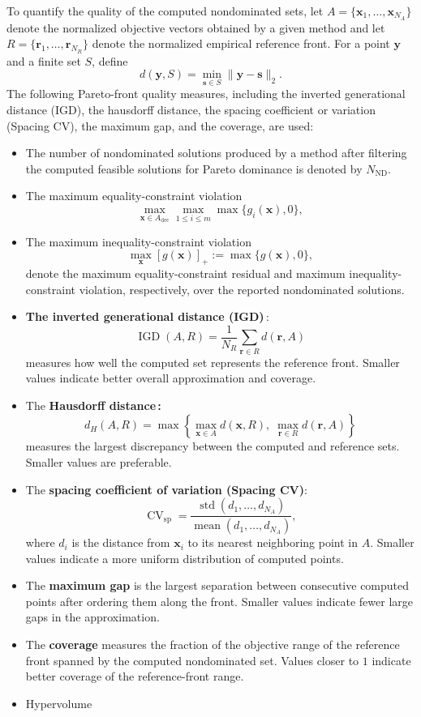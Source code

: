 \documentclass[11pt,pdflatex,sn-mathphys-ay]{sn-jnl}%
\theoremstyle{definition}
\theoremstyle{thmstyleone}%
\theoremstyle{thmstyletwo}%
\theoremstyle{thmstylethree}%
\newcommand{\add}[1]{\textcolor{revisionblue}{#1}}
\begin{document}
	\add{To quantify the quality of the computed nondominated sets, let
		$A=\{\bm{x}_1,\ldots,\bm{x}_{N_A}\}$ denote the normalized objective
		vectors obtained by a given method and let
		$R=\{\bm{r}_1,\ldots,\bm{r}_{N_R}\}$ denote the normalized empirical
		reference front. For a point $\bm{y}$ and a finite set $S$, define
		\[d(\bm{y},S)=\min_{\bm{s}\in S}\|\bm{y}-\bm{s}\|_2.\]
		The following Pareto-front quality measures, including the inverted generational distance (IGD), the hausdorff distance, the spacing coefficient or variation (Spacing CV), the maximum gap, and the coverage, are used:}
	\begin{itemize}
		\item\add{The number of nondominated solutions produced by a method after filtering the computed feasible solutions for Pareto dominance is denoted by $N_{\mathrm{ND}}$.} 
		\item The maximum equality-constraint violation
		\[
		\max_{\bm{x}\in A_{\mathrm{dec}}}
		\max_{1\leq i\leq m}
		\max\{g_i(\bm{x}),0\},
		\]
		
		\item The maximum inequality-constraint violation 
		\[\max_{\bm{x}}[g(\bm{x})]_+:=\max\{g(\bm{x}),0\},
		\]
		denote the maximum equality-constraint residual and maximum
		inequality-constraint violation, respectively, over the reported
		nondominated solutions.
		
		\item
		\add{ \textbf{The inverted generational distance (IGD)}\,\cite{van1999multiobjective,15892}: }
		\[\operatorname{IGD}(A,R) =
		\frac{1}{N_R}
		\sum_{\bm{r}\in R}d(\bm{r},A)\]
		measures how well the computed set represents the reference front.
		Smaller values indicate better overall approximation and coverage.
		\smallskip 
		\item
		\add{The \textbf{Hausdorff distance\,\cite{6151115}:}}
		\[d_H(A,R)
		=
		\max\left\{
		\max_{\bm{x}\in A}d(\bm{x},R),
		\;
		\max_{\bm{r}\in R}d(\bm{r},A)
		\right\}\]
		measures the largest discrepancy between the computed and reference
		sets. Smaller values are preferable.
		\smallskip 
		\item
		\add{The \textbf{spacing coefficient of variation (Spacing CV)}:}
		\[
		\operatorname{CV}_{\mathrm{sp}}
		=
		\frac{\operatorname{std}(d_1,\ldots,d_{N_A})}
		{\operatorname{mean}(d_1,\ldots,d_{N_A})},
		\]
		where $d_i$ is the distance from $\bm{x}_i$ to its nearest neighboring
		point in $A$. Smaller values indicate a more uniform distribution of
		computed points.
		\smallskip 
		\item
		\add{The \textbf{maximum gap} is the largest separation between consecutive
			computed points after ordering them along the front. Smaller values
			indicate fewer large gaps in the approximation.}
		\smallskip 
		\item
		\add{The \textbf{coverage} measures the fraction of the objective range of
			the reference front spanned by the computed nondominated set. Values
			closer to $1$ indicate better coverage of the reference-front range.}
		
		\item Hypervolume\,\cite{zitzler2007hypervolume,797969}
	\end{itemize}
\end{document}
